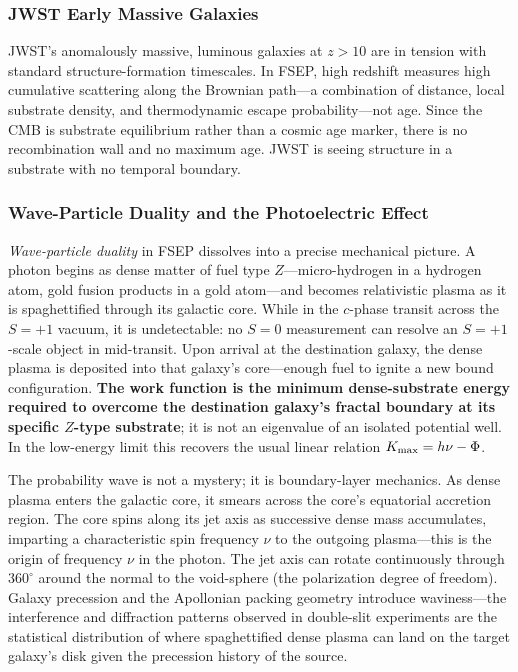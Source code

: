 \documentclass[11pt,letterpaper]{article}
\begin{document}
\subsubsection{JWST Early Massive Galaxies}
JWST's anomalously massive, luminous galaxies at $z>10$ \cite{Huang2024} are in
tension with standard structure-formation timescales. In FSEP, high redshift
measures high cumulative scattering along the Brownian path---a combination of
distance, local substrate density, and thermodynamic escape probability---not age.
Since the CMB is substrate equilibrium rather than a cosmic age marker, there is no
recombination wall and no maximum age. JWST is seeing structure in a substrate with
no temporal boundary.

\subsubsection{Wave-Particle Duality and the Photoelectric Effect}
\label{sec:waveparticle}
\textit{Wave-particle duality} in FSEP dissolves into a precise mechanical picture.
A photon begins as dense matter of fuel type $Z$---micro-hydrogen in a hydrogen
atom, gold fusion products in a gold atom---and becomes relativistic plasma as it is
spaghettified through its galactic core. While in the $c$-phase transit across the
$S{=}+1$ vacuum, it is undetectable: no $S{=}0$ measurement can resolve an
$S{=}+1$-scale object in mid-transit. Upon arrival at the destination galaxy, the
dense plasma is deposited into that galaxy's core---enough fuel to ignite a new
bound configuration. \textbf{The work function is the minimum dense-substrate
energy required to overcome the destination galaxy's fractal boundary at its
specific $Z$-type substrate}; it is not an eigenvalue of an isolated potential well.
In the low-energy limit this recovers the usual linear relation $K_{\rm
max}=h\nu-\Phi$.

The probability wave is not a mystery; it is boundary-layer mechanics. As dense
plasma enters the galactic core, it smears across the core's equatorial accretion
region. The core spins along its jet axis as successive dense mass accumulates,
imparting a characteristic spin frequency $\nu$ to the outgoing plasma---this is
the origin of frequency $\nu$ in the photon. The jet axis can rotate continuously
through $360^\circ$ around the normal to the void-sphere (the polarization degree
of freedom). Galaxy precession and the Apollonian packing geometry introduce
waviness---the interference and diffraction patterns observed in double-slit
experiments are the statistical distribution of where spaghettified dense plasma
can land on the target galaxy's disk given the precession history of the source.
\end{document}
